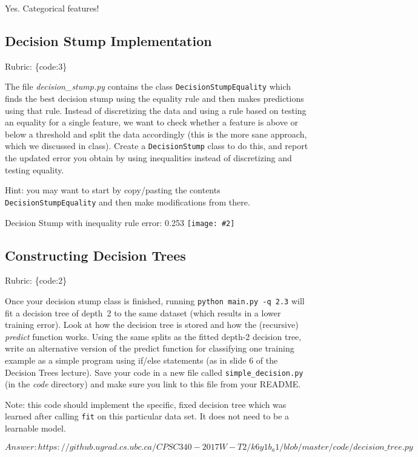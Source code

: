 \documentclass{article}
\def\blu#1{{\color{blu}#1}}
\def\gre#1{{\color{gre}#1}}
\newcommand{\fig}[2]{\texttt{[image: \#2]}}
\def\rubric#1{\gre{Rubric: \{#1\}}}{}
\begin{document}
Yes. Categorical features!


\subsection{Decision Stump Implementation}
\rubric{code:3}

The file \emph{decision\_stump.py} contains the class \texttt{DecisionStumpEquality} which finds the best decision stump using the equality rule and then makes predictions using that rule. Instead of discretizing the data and using a rule based on testing an equality for a single feature, we want to check whether a feature is above or below a threshold and split the data accordingly (this is the more sane approach, which we discussed in class). \blu{Create a \texttt{DecisionStump} class to do this, and report the updated error you obtain by using inequalities instead of discretizing and testing equality.}

Hint: you may want to start by copy/pasting the contents \texttt{DecisionStumpEquality} and then make modifications from there. 

Decision Stump with inequality rule error: 0.253
\fig{0.5}{../figs/q2_2_decisionBoundary}


\subsection{Constructing Decision Trees}
\rubric{code:2}

Once your decision stump class is finished, running \texttt{python main.py -q 2.3} will fit
a decision tree of depth~2 to the same dataset (which results in a lower training error).
Look at how the decision tree is stored and how the (recursive) \emph{predict} function works.
\blu{Using the same splits as the fitted depth-2 decision tree, write an alternative version of the predict
function for classifying one training example as a simple program using if/else statements
(as in slide 6 of the Decision Trees lecture).} Save your code in a new file called
\texttt{simple\string_decision.py} (in the \emph{code} directory) and make sure you link to this file from your README.

Note: this code should implement the specific, fixed decision tree
which was learned after calling \texttt{fit} on this particular data set. It does not need to be a learnable model.

$Answer:https://github.ugrad.cs.ubc.ca/CPSC340-2017W-T2/k6y1b_a1/blob/master/code/decision\_tree.py$
\end{document}
